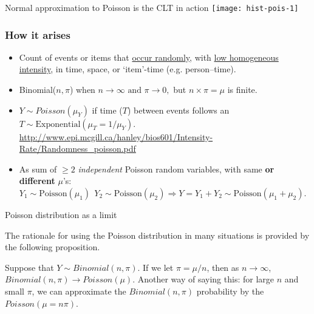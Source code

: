 \documentclass[10pt]{beamer}\usepackage[]{graphicx}\usepackage[]{color}
\begin{document}
\begin{frame}{Normal approximation to Poisson is the CLT in action}
	\texttt{[image: hist-pois-1]} 
\end{frame}	



\begin{frame}
	\frametitle{How it arises}
	
	
	\begin{itemize}
		\setlength\itemsep{1em}
		\item  Count of events or items that \underline{occur randomly}, with \underline{low homogeneous intensity}, in time, space, or `item'-time (e.g. person--time). 
		\item Binomial($n,\pi$) when $n \rightarrow \infty\textrm{ and } \pi \rightarrow 0,$ but $n \times \pi = \mu$ is finite.
		\item $Y\sim Poisson(\mu_Y)$ if time ($T$) between events follows an $T \sim \textrm{Exponential}(\mu_{T} = 1/\mu_{Y}).$ 
		{ \scriptsize   \url{http://www.epi.mcgill.ca/hanley/bios601/Intensity-Rate/Randomness_poisson.pdf}} 
		\item  As sum of $\ge 2$  \textit{independent} Poisson random variables, 
		with same \textbf{or different} $\mu$'s: \newline 
		$Y_{1} \sim \textrm{Poisson}(\mu_{1}) \: \:   
		Y_{2} \sim \textrm{Poisson}(\mu_{2}) \Rightarrow Y = Y_{1} + Y_{2} \sim \textrm{Poisson}(\mu_{1}+\mu_{2}).$
	\end{itemize}
\end{frame}




\begin{frame}{Poisson distribution as a limit}
	
	The rationale for using the Poisson distribution in many situations is provided by the following proposition.
	
	\vspace*{0.5in}
	
	\begin{proposition}
		Suppose that $Y \sim Binomial(n,\pi)$. If we let $\pi = \mu/n$, then as $n \rightarrow \infty$, $Binomial(n,\pi) \rightarrow Poisson(\mu)$. Another way of saying this: for large $n$ and small $\pi$, we can approximate the $Binomial(n,\pi)$ probability by the $Poisson(\mu = n\pi)$. 
	\end{proposition}
	
\end{frame}
\end{document}
